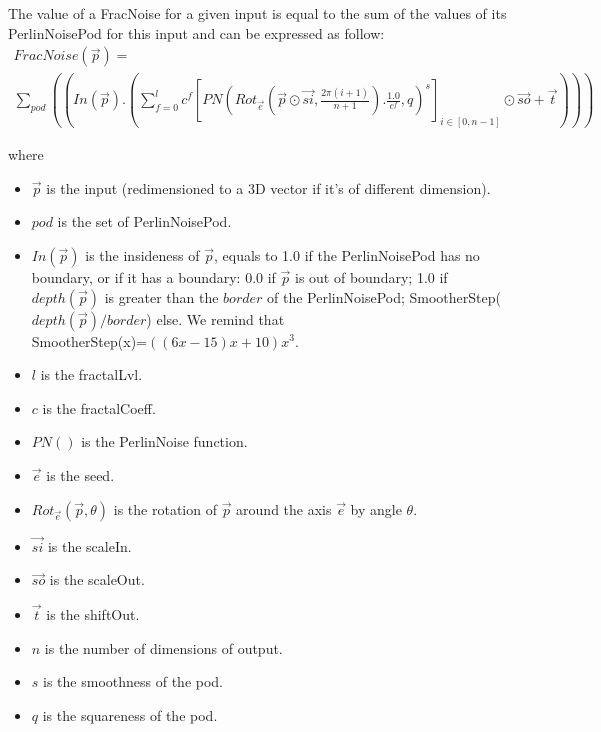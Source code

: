 The value of a FracNoise for a given input is equal to the sum of the values of its PerlinNoisePod for this input and can be expressed as follow:\\

\begin{equation}
\begin{array}{l}
FracNoise(\overrightarrow{p})=\\
\sum_{pod}\left(
  \left(
    In(\overrightarrow{p}).
    \left(
      \sum_{f=0}^lc^f
      \left[
        PN\left(
          Rot_{\overrightarrow{e}}\left(
            \overrightarrow{p}\odot\overrightarrow{si},\frac{2\pi(i+1)}{n+1}          
          \right).\frac{1.0}{c^f},q
        \right)^s
      \right]_{i\in[0,n-1]}
      \odot \overrightarrow{so}+\overrightarrow{t}
    \right)
  \right)
\right)
\end{array}
\end{equation}

where\\
\begin{itemize}
\item $\overrightarrow{p}$ is the input (redimensioned to a 3D vector if it's of different dimension).
\item $pod$ is the set of PerlinNoisePod.
\item $In(\overrightarrow{p})$ is the insideness of $\overrightarrow{p}$, equals to 1.0 if the PerlinNoisePod has no boundary, or if it has a boundary: 0.0 if $\overrightarrow{p}$ is out of boundary; 1.0 if $depth(\overrightarrow{p})$ is greater than the $border$ of the PerlinNoisePod; SmootherStep($depth(\overrightarrow{p})/border$) else. We remind that\\ SmootherStep(x)=$((6x-15)x+10)x^3$.
\item $l$ is the fractalLvl.
\item $c$ is the fractalCoeff.
\item $PN()$ is the PerlinNoise function.
\item $\overrightarrow{e}$ is the seed.
\item $Rot_{\overrightarrow{e}}(\overrightarrow{p}, \theta)$ is the rotation of $\overrightarrow{p}$ around the axis $\overrightarrow{e}$ by angle $\theta$.
\item $\overrightarrow{si}$ is the scaleIn.
\item $\overrightarrow{so}$ is the scaleOut.
\item $\overrightarrow{t}$ is the shiftOut.
\item $n$ is the number of dimensions of output.
\item $s$ is the smoothness of the pod.
\item $q$ is the squareness of the pod.
\end{itemize}

